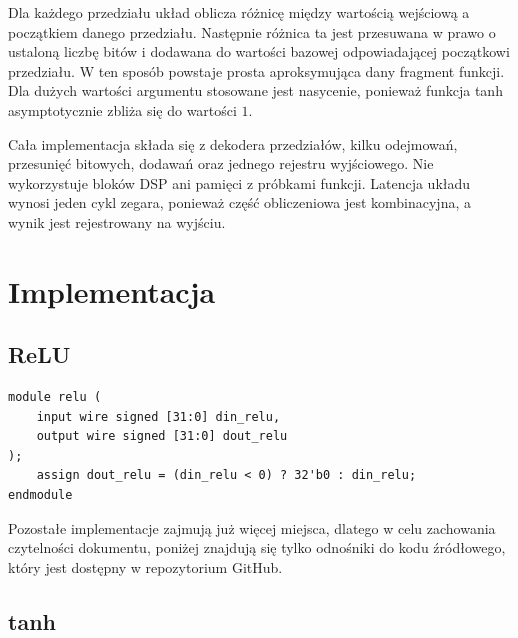 \documentclass[12pt, a4paper, oneside]{scrreprt}
\begin{document}
Dla każdego przedziału układ oblicza różnicę między wartością wejściową a początkiem danego
przedziału. Następnie różnica ta jest przesuwana w prawo o ustaloną liczbę bitów i dodawana
do wartości bazowej odpowiadającej początkowi przedziału. W ten sposób powstaje prosta
aproksymująca dany fragment funkcji. Dla dużych wartości argumentu stosowane jest nasycenie,
ponieważ funkcja tanh asymptotycznie zbliża się do wartości $1$.

Cała implementacja składa się z dekodera przedziałów, kilku odejmowań, przesunięć bitowych,
dodawań oraz jednego rejestru wyjściowego. Nie wykorzystuje bloków DSP ani pamięci z próbkami
funkcji. Latencja układu wynosi jeden cykl zegara, ponieważ część obliczeniowa jest kombinacyjna,
a wynik jest rejestrowany na wyjściu.

\chapter{Implementacja}

\section{ReLU}

\begin{listing}[htbp]
    \begin{verbatim}
module relu (
    input wire signed [31:0] din_relu,
    output wire signed [31:0] dout_relu
);
    assign dout_relu = (din_relu < 0) ? 32'b0 : din_relu;
endmodule
    \end{verbatim}
    \caption{Implementacja funkcji ReLU w Verilog'u \cite{thedatabus}}
    \label{lst:ReLUVerilog}
\end{listing}

Pozostałe implementacje zajmują już więcej miejsca, dlatego w celu zachowania czytelności dokumentu,
poniżej znajdują się tylko odnośniki do kodu źródłowego, który jest dostępny w repozytorium GitHub.

\section{tanh}
\end{document}
